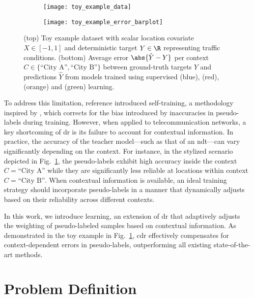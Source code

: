 \documentclass[journal]{IEEEtran}
\begin{document}
\begin{figure}
    \centering
    \begin{subfigure}{\columnwidth}
        \centering
        \texttt{[image: toy\_example\_data]}
    \end{subfigure}
    \begin{subfigure}{\columnwidth}
        \centering
        \texttt{[image: toy\_example\_error\_barplot]}
    \end{subfigure}
    \caption{
    (top) Toy example dataset with scalar location covariate $X \in [-1, 1]$ and deterministic target $Y \in \R$ representing traffic conditions.
    (bottom) Average error $\abs{\hat{Y} - Y}$ per context $C \in \{\text{``City A''}, \text{``City B''}\}$ between ground-truth targets $Y$ and predictions $\hat{Y}$ from models trained using supervised  (blue),  (red),  (orange) and  (green) learning.
    }
    \label{fig:toy_example}
\end{figure}

To address this limitation, reference \cite{zhu2024doubly} introduced  self-training, a methodology inspired by \cite{angelopoulos2023prediction}, which corrects for the bias introduced by inaccuracies in pseudo-labels during training. 
However, when applied to telecommunication networks, a key shortcoming of \gls{dr} is its failure to account for contextual information.
In practice, the accuracy of the teacher model—such as that of an \gls{ndt}—can vary significantly depending on the context.
For instance, in the stylized scenario depicted in Fig.~\ref{fig:toy_example}, the pseudo-labels exhibit high accuracy inside the context $C=\text{``City A''}$ while they are significantly less reliable at locations within context $C=\text{``City B''}$.
When contextual information is available, an ideal training strategy should incorporate pseudo-labels in a manner that dynamically adjusts based on their reliability across different contexts. 

In this work, we introduce  learning, an extension of \gls{dr} that adaptively adjusts the weighting of pseudo-labeled samples based on contextual information. 
As demonstrated in the toy example in Fig.~\ref{fig:toy_example}, \gls{cdr} effectively compensates for context-dependent errors in pseudo-labels, outperforming all existing state-of-the-art methods.


\section{Problem Definition} \label{sec:setting}
\end{document}
